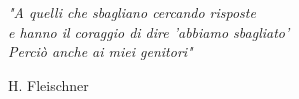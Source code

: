{
\thispagestyle{empty}


\vspace*{3cm}
\hskip5cm\parbox[t]{10cm}
{\large 
\textit{"A quelli che sbagliano cercando risposte\\
e hanno il coraggio di dire 'abbiamo sbagliato'\\
Perci\`o anche ai miei genitori"\\ }
}

\vspace*{0.05cm}
\hskip12cm\parbox[t]{5cm}{\small{H. Fleischner}}


\newpage
\newpage
\thispagestyle{empty}
\clearpage
}

